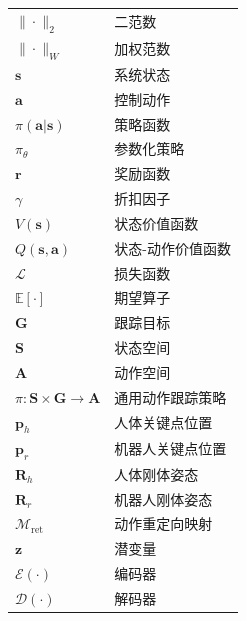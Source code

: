 \begin{table}[htbp]
\begin{tabular}{ll}
		$\|\cdot\|_2$ & 二范数 \\
		
		$\|\cdot\|_W$ & 加权范数 \\
		
		$\mathbf{s}$ & 系统状态 \\
		
		$\mathbf{a}$ & 控制动作 \\
		
		$\pi(\mathbf{a}|\mathbf{s})$ & 策略函数 \\
		
		$\pi_\theta$ & 参数化策略 \\
		
		$\mathbf{r}$ & 奖励函数 \\
		
		$\gamma$ & 折扣因子 \\
		
		$V(\mathbf{s})$ & 状态价值函数 \\
		
		$Q(\mathbf{s},\mathbf{a})$ & 状态-动作价值函数 \\
		
		$\mathcal{L}$ & 损失函数 \\
		
		$\mathbb{E}[\cdot]$ & 期望算子 \\
		
		$\mathbf{G}$ & 跟踪目标 \\
		
		$\mathbf{S}$ & 状态空间 \\
		
		$\mathbf{A}$ & 动作空间 \\
		
		$\pi: \mathbf{S}\times\mathbf{G} \rightarrow \mathbf{A}$ & 通用动作跟踪策略 \\
		
		$\mathbf{p}_h$ & 人体关键点位置 \\
		
		$\mathbf{p}_r$ & 机器人关键点位置 \\
		
		$\mathbf{R}_h$ & 人体刚体姿态 \\
		
		$\mathbf{R}_r$ & 机器人刚体姿态 \\
		
		$\mathcal{M}_{\mathrm{ret}}$ & 动作重定向映射 \\
		
		$\mathbf{z}$ & 潜变量 \\
		
		$\mathcal{E}(\cdot)$ & 编码器 \\
		
		$\mathcal{D}(\cdot)$ & 解码器 \\
		
		\bottomrule
	\end{tabular}
\end{table}